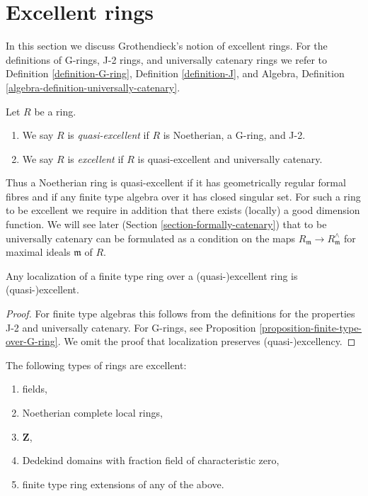 \section{Excellent rings}
\label{section-excellent}

\noindent
In this section we discuss Grothendieck's notion of excellent rings.
For the definitions of G-rings, J-2 rings, and universally catenary rings
we refer to Definition \ref{definition-G-ring},
Definition \ref{definition-J}, and
Algebra, Definition \ref{algebra-definition-universally-catenary}.

\begin{definition}
\label{definition-excellent}
Let $R$ be a ring.
\begin{enumerate}
\item We say $R$ is {\it quasi-excellent} if $R$ is Noetherian,
a G-ring, and J-2.
\item We say $R$ is {\it excellent} if $R$ is quasi-excellent
and universally catenary.
\end{enumerate}
\end{definition}

\noindent
Thus a Noetherian ring is quasi-excellent if it has geometrically regular
formal fibres and if any finite type algebra over it has closed singular
set. For such a ring to be excellent we require in addition that there
exists (locally) a good dimension function. We will see later
(Section \ref{section-formally-catenary})
that to be universally catenary can be formulated
as a condition on the maps $R_\mathfrak m \to R_\mathfrak m^\wedge$
for maximal ideals $\mathfrak m$ of $R$.

\begin{lemma}
\label{lemma-finite-type-over-excellent}
Any localization of a finite type ring over a (quasi-)excellent ring
is (quasi-)excellent.
\end{lemma}

\begin{proof}
For finite type algebras this follows from the definitions for
the properties J-2 and universally catenary. For G-rings, see
Proposition \ref{proposition-finite-type-over-G-ring}. We omit
the proof that localization preserves (quasi-)excellency.
\end{proof}

\begin{proposition}
\label{proposition-ubiquity-excellent}
The following types of rings are excellent:
\begin{enumerate}
\item fields,
\item Noetherian complete local rings,
\item $\mathbf{Z}$,
\item Dedekind domains with fraction field of characteristic zero,
\item finite type ring extensions of any of the above.
\end{enumerate}
\end{proposition}


